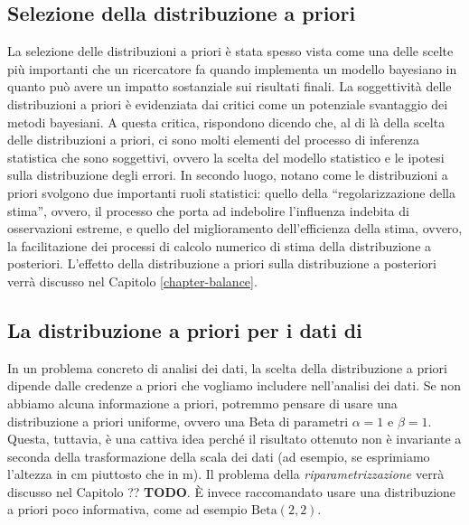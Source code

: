 \documentclass[
  11pt,
]{krantz}
\theoremstyle{definition}
\theoremstyle{definition}
\theoremstyle{definition}
\theoremstyle{definition}
\theoremstyle{remark}
\begin{document}
\hypertarget{selezione-della-distribuzione-a-priori}{%
\subsection{Selezione della distribuzione a priori}\label{selezione-della-distribuzione-a-priori}}

La selezione delle distribuzioni a priori è stata spesso vista come una delle scelte più importanti che un ricercatore fa quando implementa un modello bayesiano in quanto può avere un impatto sostanziale sui risultati finali. La soggettività delle distribuzioni a priori è evidenziata dai critici come un potenziale svantaggio dei metodi bayesiani. A questa critica, \citet{vandeSchoot2021modelling} rispondono dicendo che, al di là della scelta delle distribuzioni a priori, ci sono molti elementi del processo di inferenza statistica che sono soggettivi, ovvero la scelta del modello statistico e le ipotesi sulla distribuzione degli errori. In secondo luogo, \citet{vandeSchoot2021modelling} notano come le distribuzioni a priori svolgono due importanti ruoli statistici: quello della ``regolarizzazione della stima'', ovvero, il processo che porta ad indebolire l'influenza indebita di osservazioni estreme, e quello del miglioramento dell'efficienza della stima, ovvero, la facilitazione dei processi di calcolo numerico di stima della distribuzione a posteriori. L'effetto della distribuzione a priori sulla distribuzione a posteriori verrà discusso nel Capitolo \ref{chapter-balance}.

\hypertarget{la-distribuzione-a-priori-per-i-dati-di-zetschefuture2019}{%
\subsection{\texorpdfstring{La distribuzione a priori per i dati di \citet{zetschefuture2019}}{La distribuzione a priori per i dati di @zetschefuture2019}}\label{la-distribuzione-a-priori-per-i-dati-di-zetschefuture2019}}

In un problema concreto di analisi dei dati, la scelta della distribuzione a priori dipende dalle credenze a priori che vogliamo includere nell'analisi dei dati. Se non abbiamo alcuna informazione a priori, potremmo pensare di usare una distribuzione a priori uniforme, ovvero una Beta di parametri \(\alpha=1\) e \(\beta=1\). Questa, tuttavia, è una cattiva idea perché il risultato ottenuto non è invariante a seconda della trasformazione della scala dei dati (ad esempio, se esprimiamo l'altezza in cm piuttosto che in m). Il problema della \emph{riparametrizzazione} verrà discusso nel Capitolo ?? \textbf{TODO}. È invece raccomandato usare una distribuzione a priori poco informativa, come ad esempio \(\mbox{Beta}(2, 2)\).
\end{document}
